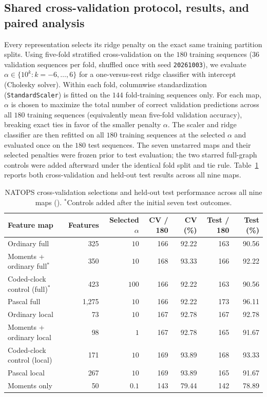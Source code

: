 \subsection{Shared cross-validation protocol, results, and paired analysis}
Every representation selects its ridge penalty on the exact same training
partition splits. Using five-fold stratified cross-validation on the \(180\)
training sequences (\(36\) validation sequences per fold, shuffled once with seed
\texttt{20261003}), we evaluate \(\alpha \in \{10^k : k = -6, \ldots, 6\}\) for a
one-versus-rest ridge classifier with intercept (Cholesky solver). Within each
fold, columnwise standardization (\texttt{StandardScaler}) is fitted on the \(144\)
fold-training sequences only. For each map, \(\alpha\) is chosen to maximize the
total number of correct validation predictions across all \(180\) training
sequences (equivalently mean five-fold validation accuracy), breaking exact ties
in favor of the smaller penalty \(\alpha\). The scaler and ridge classifier are
then refitted on all \(180\) training sequences at the selected \(\alpha\) and
evaluated once on the \(180\) test sequences. The seven unstarred maps and their
selected penalties were frozen prior to test evaluation; the two starred
full-graph controls were added afterward under the identical fold split and tie
rule. Table~\ref{tab:natops-results} reports both cross-validation and held-out
test results across all nine maps.

\begin{table}[ht]
\centering
\begin{tabular}{@{}lrrrrrr@{}}
\toprule
Feature map & Features & Selected \(\alpha\) & CV / 180 & CV (\%) & Test / 180 & Test (\%) \\
\midrule
Ordinary full & 325 & \(10\) & 166 & 92.22 & 163 & 90.56 \\
Moments + ordinary full\(^*\) & 350 & \(10\) & 168 & 93.33 & 166 & 92.22 \\
Coded-clock control (full)\(^*\) & 423 & \(100\) & 166 & 92.22 & 163 & 90.56 \\
Pascal full & 1,275 & \(10\) & 166 & 92.22 & 173 & 96.11 \\
\midrule
Ordinary local & 73 & \(10\) & 167 & 92.78 & 167 & 92.78 \\
Moments + ordinary local & 98 & \(1\) & 167 & 92.78 & 165 & 91.67 \\
Coded-clock control (local) & 171 & \(10\) & 169 & 93.89 & 168 & 93.33 \\
Pascal local & 267 & \(10\) & 169 & 93.89 & 165 & 91.67 \\
\midrule
Moments only & 50 & \(0.1\) & 143 & 79.44 & 142 & 78.89 \\
\bottomrule
\end{tabular}
\caption{NATOPS cross-validation selections and held-out test performance across
all nine maps (\cite[Table~2]{mainpaper}). \(^*\)Controls added after the initial
seven test outcomes.}
\label{tab:natops-results}
\end{table}

